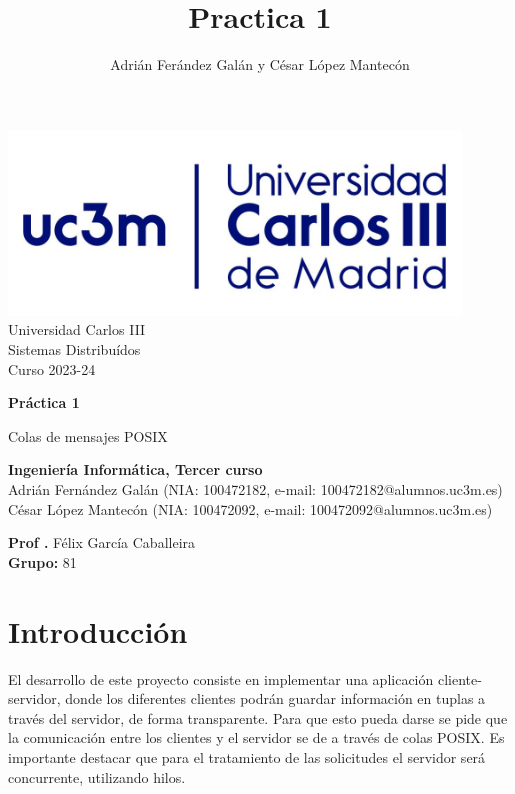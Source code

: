 \documentclass[]{article}
\title{Practica 1}
\author{Adrián Ferández Galán y César López Mantecón}
\begin{document}
\begin{titlepage}
    \centering
   \includegraphics[width=0.9\textwidth]{uc3m.jpg} 
    {\Huge Universidad Carlos III\\
    
     \Large Sistemas Distribuídos\\
     \vspace{0.5cm}
     Curso 2023-24}
    \vspace{2cm}

    {\Huge \textbf{Práctica 1} \par}
    \vspace{0.5cm}
    {\Large Colas de mensajes POSIX \par}
    \vspace{8cm}

   \textbf{Ingeniería Informática, Tercer curso}\\
    \vspace{0.2cm} 
    Adrián Fernández Galán (NIA: 100472182, e-mail: 100472182@alumnos.uc3m.es) \\
    César López Mantecón   (NIA: 100472092, e-mail: 100472092@alumnos.uc3m.es)
    \vspace{0.5cm}

   
    \textbf{Prof .} Félix García Caballeira\\
    \textbf{Grupo: } 81   
    
\end{titlepage}
\newpage

\renewcommand{\contentsname}{\centering Índice}
\tableofcontents

\newpage

\section{Introducción}
\label{sec:introduccion}
El desarrollo de este proyecto consiste en implementar una aplicación cliente-servidor, donde los diferentes clientes podrán guardar información en tuplas a través del servidor, de forma transparente.
Para que esto pueda darse se pide que la comunicación entre los clientes y el servidor se de a través de colas POSIX.
Es importante destacar que para el tratamiento de las solicitudes el servidor será concurrente, utilizando hilos.
\end{document}
